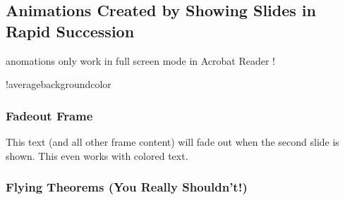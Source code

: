 \documentclass{beamer}
\begin{document}
\subsection{Animations Created by Showing Slides in Rapid Succession}
\newcount\opaqueness
\begin{frame}
  anomations only work in full screen mode in Acrobat Reader !
  \begin{colormixin}{\the\opaqueness!averagebackgroundcolor}
    \frametitle{Fadeout Frame}
    This text (and all other frame content) will fade out when the
    second slide is shown. This even works with
    {\color{green!90!black}colored} \alert{text}.
  \end{colormixin}
\end{frame}
\newcount\opaqueness
\newdimen\offset
\begin{frame}
  \frametitle{Flying Theorems (You Really Shouldn't!)}
\end{frame}
\end{document}
